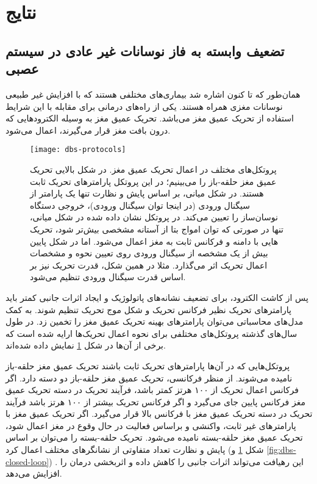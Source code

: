 \section{نتایج }
\subsection{تضعیف وابسته به فاز نوسانات غیر عادی در سیستم عصبی}
همان‌طور که تا کنون اشاره شد بیماری‌های مختلفی هستند که با افزایش غیر طبیعی نوسانات مغزی همراه هستند. 
 یکی از راه‌های درمانی برای مقابله با این شرایط استفاده از تحریک عمیق مغز می‌باشد. تحریک عمیق مغز به وسیله الکترودهایی که درون بافت مغز قرار می‌گیرند، اعمال می‌شود.

\begin{figure}
	\centering
	\texttt{[image: dbs-protocols]}
    \caption{
    پروتکل‌های مختلف در اعمال تحریک عمیق مغز.
در شکل بالایی تحریک عمیق مغز حلقه-باز را می‌بینیم؛ در این پروتکل پارامترهای تحریک ثابت هستند. 
در شکل میانی، بر اساس پایش و نظارت تنها یک پارامتر از سیگنال ورودی (در اینجا توان سیگنال ورودی)، خروجی دستگاه نوسان‌ساز را تعیین می‌کند. در پروتکل نشان داده شده در شکل میانی، تنها در صورتی که توان امواج بتا از آستانه مشخصی بیش‌تر شود، تحریک هایی با دامنه و فرکانس ثابت به مغز اعمال می‌شود. اما در شکل پایین بیش از یک مشخصه از سیگنال ورودی روی تعیین نحوه و مشخصات اعمال تحریک اثر می‌گذارد. مثلا در همین شکل، قدرت تحریک نیز بر اساس قدرت سیگنال ورودی تنظیم می‌شود.
    }
    \label{fig:dbs-protocols}
\end{figure}


پس از کاشت الکترود، برای تضعیف نشانه‌های پاتولوژیک و ایجاد اثرات جانبی کمتر باید پارامترهای تحریک نظیر فرکانس تحریک و شکل موج تحریک تنظیم شوند. به کمک مدل‌های محاسباتی می‌توان پارامترهای بهینه تحریک عمیق مغز را تخمین زد. در طول سال‌های گذشته پروتکل‌های مختلفی برای نحوه اعمال تحریک‌ها ارایه شده است که برخی از آن‌ها در شکل
\ref{fig:dbs-protocols}
نمایش داده شده‌اند. 

پروتکل‌هایی که در آن‌ها پارامترهای تحریک ثابت باشند تحریک عمیق مغز حلقه-باز نامیده می‌شوند.
 از منظر فرکانسی، تحریک عمیق مغز حلقه-باز دو دسته دارد. اگر فرکانس اعمال تحریک از ۱۰۰ هرتز کمتر باشد، فرآیند تحریک در دسته تحریک عمیق مغز فرکانس پایین جای می‌گیرد و اگر فرکانس تحریک بیشتر از ۱۰۰ هرتز باشد فرآیند تحریک در دسته تحریک عمیق مغز با فرکانس بالا قرار می‌گیرد. اگر تحریک عمیق مغز با پارامتر‌های غیر ثابت، واکنشی و براساس فعالیت در حال وقوع در مغز اعمال شود، تحریک عمیق مغز حلقه-بسته نامیده می‌شود. تحریک حلقه-بسته را می‌توان بر اساس  پایش و نظارت تعداد متفاوتی از نشانگرهای مختلف اعمال کرد (شکل
 \ref{fig:dbs-protocols}
 و
  \ref{fig:dbs-closed-loop})
  . این رهیافت می‌تواند اثرات جانبی را کاهش داده و اثربخشی درمان را افزایش می‌دهد.
 
